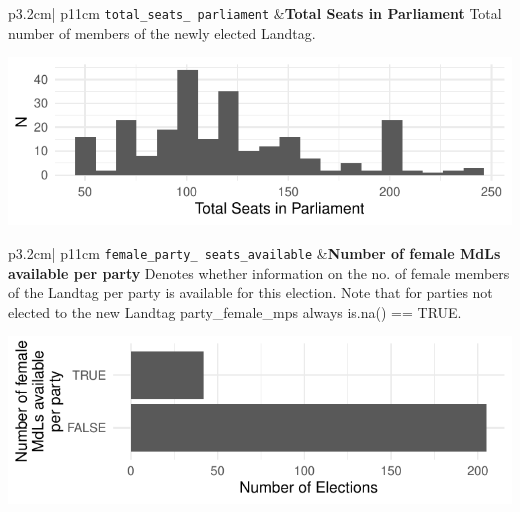 \documentclass[
]{article}
\begin{document}
\begin{longtable}{p{3.2cm}| p{11cm}}
\texttt{total\_seats\_
parliament} &\textbf{Total Seats in Parliament}\newline 
Total number of members of the newly elected Landtag.

\hspace*{.25cm}
\begin{minipage}[t]{\linewidth }
\vspace{0pt}
\includegraphics[width = \linewidth]{cbelec/tseatsparlplot.pdf}
\end{minipage}


\end{longtable}

\begin{longtable}{p{3.2cm}| p{11cm}}
\texttt{female\_party\_
seats\_available} &\textbf{Number of female MdLs available per party}\newline 
Denotes whether information on the no. of female members of the Landtag per party is available for this election. Note that for parties not elected to the new Landtag party\_female\_mps always is.na() == TRUE.

\hspace*{.25cm}
\begin{minipage}[t]{\linewidth }
\vspace{0pt}
\includegraphics[width = \linewidth]{cbelec/fpsaplot.pdf}
\end{minipage}


\end{longtable}
\end{document}
